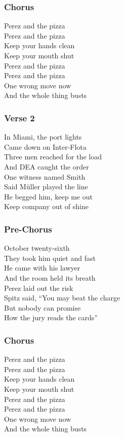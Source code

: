 \subsubsection{Chorus}\label{chorus-29}

Perez and the pizza\\
Perez and the pizza\\
Keep your hands clean\\
Keep your mouth shut\\
Perez and the pizza\\
Perez and the pizza\\
One wrong move now\\
And the whole thing busts

\subsubsection{Verse 2}\label{verse-2-10}

In Miami, the port lights\\
Came down on Inter-Flota\\
Three men reached for the load\\
And DEA caught the order\\
One witness named Smith\\
Said Müller played the line\\
He begged him, keep me out\\
Keep company out of shine

\subsubsection{Pre-Chorus}\label{pre-chorus-11}

October twenty-sixth\\
They took him quiet and fast\\
He came with his lawyer\\
And the room held its breath\\
Perez laid out the risk\\
Spitz said, ``You may beat the charge\\
But nobody can promise\\
How the jury reads the cards''

\subsubsection{Chorus}\label{chorus-30}

Perez and the pizza\\
Perez and the pizza\\
Keep your hands clean\\
Keep your mouth shut\\
Perez and the pizza\\
Perez and the pizza\\
One wrong move now\\
And the whole thing busts

